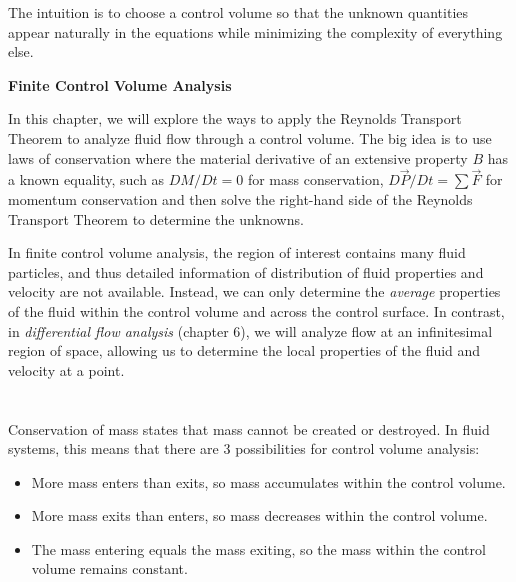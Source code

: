 ﻿\documentclass[12pt]{article}
\begin{document}
The intuition is to choose a control volume so that the unknown quantities appear naturally in the equations while minimizing the complexity of everything else.
\begin{center}
    {\LARGE\bfseries Finite Control Volume Analysis\par}
\end{center}
In this chapter, we will explore the ways to apply the Reynolds Transport Theorem to analyze fluid flow through a control volume. The big idea is to use laws of conservation where the material derivative of an extensive property $B$ has a known equality, such as $DM/Dt=0$ for mass conservation, $D\vec{P}/Dt=\sum \vec{F}$ for momentum conservation and then solve the right-hand side of the Reynolds Transport Theorem to determine the unknowns.
\begin{notebox}[]
In finite control volume analysis, the region of interest contains many fluid particles, and thus detailed information of distribution of fluid properties and velocity are not available. Instead, we can only determine the \textit{average} properties of the fluid within the control volume and across the control surface. In contrast, in \textit{differential flow analysis} (chapter 6), we will analyze flow at an infinitesimal region of space, allowing us to determine the local properties of the fluid and velocity at a point.
\end{notebox}
\newpage
\section*{}
Conservation of mass states that mass cannot be created or destroyed. In fluid systems, this means that there are 3 possibilities for control volume analysis:
\begin{itemize}
    \item[1)] More mass enters than exits, so mass accumulates within the control volume.
    \item[2)] More mass exits than enters, so mass decreases within the control volume.
    \item[3)] The mass entering equals the mass exiting, so the mass within the control volume remains constant.
\end{itemize} 
\end{document}
